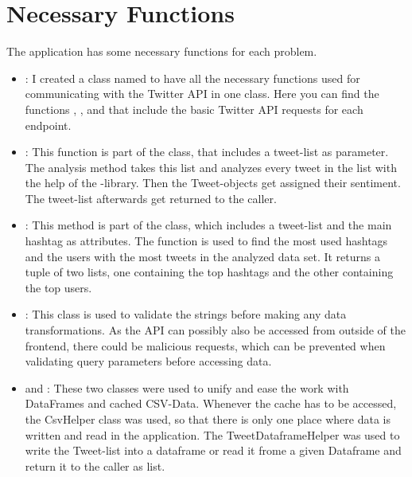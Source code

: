\documentclass[a4paper,oneside,11pt]{scrreprt}
\begin{document}
\section{Necessary Functions}

The application has some necessary functions for each problem.

\begin{itemize}
    \item {}: I created a class named  to have all the necessary functions used for communicating with the Twitter API in one class. Here you can find the functions , ,  and  that include the basic Twitter API requests for each endpoint.
    \item {}: This function is part of the  class, that includes a tweet-list as parameter. The analysis method takes this list and analyzes every tweet in the list with the help of the -library. Then the Tweet-objects get assigned their sentiment. The tweet-list afterwards get returned to the caller.
    \item {}: This method is part of the  class, which includes a tweet-list and the main hashtag as attributes. The function is used to find the most used hashtags and the users with the most tweets in the analyzed data set. It returns a tuple of two lists, one containing the top hashtags and the other containing the top users.
    \item {}: This class is used to validate the strings before making any data transformations. As the API can possibly also be accessed from outside of the frontend, there could be malicious requests, which can be prevented when validating query parameters before accessing data.
    \item {} and : These two classes were used to unify and ease the work with DataFrames and cached CSV-Data. Whenever the cache has to be accessed, the CsvHelper class was used, so that there is only one place where data is written and read in the application. The TweetDataframeHelper was used to write the Tweet-list into a dataframe or read it frome a given Dataframe and return it to the caller as list.
\end{itemize}
\end{document}
